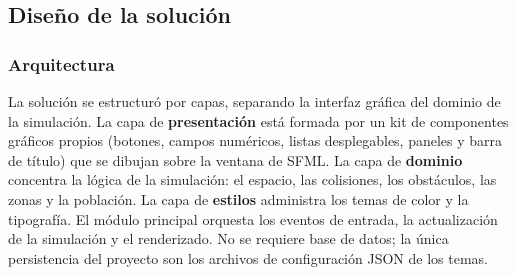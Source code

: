 \documentclass[12pt,a4paper]{article}
\begin{document}
\subsection{Diseño de la solución}

\subsubsection{Arquitectura}

La solución se estructuró por capas, separando la interfaz gráfica del dominio de la simulación. La capa de \textbf{presentación} está formada por un kit de componentes gráficos propios (botones, campos numéricos, listas desplegables, paneles y barra de título) que se dibujan sobre la ventana de SFML. La capa de \textbf{dominio} concentra la lógica de la simulación: el espacio, las colisiones, los obstáculos, las zonas y la población. La capa de \textbf{estilos} administra los temas de color y la tipografía. El módulo principal orquesta los eventos de entrada, la actualización de la simulación y el renderizado. No se requiere base de datos; la única persistencia del proyecto son los archivos de configuración JSON de los temas.
\end{document}
